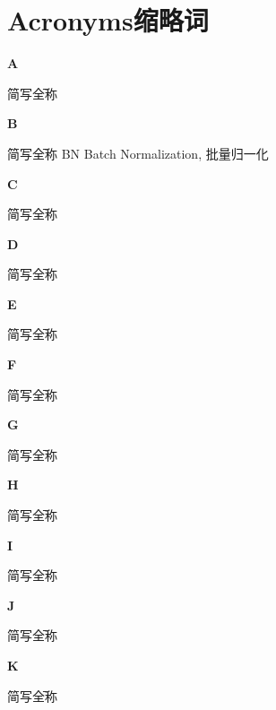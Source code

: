 \section{Acronyms缩略词}



\noindent\textbf{\LARGE A}
\begin{tabbing}
    简写\qquad\qquad\qquad\= 全称 \kill
\end{tabbing}

\noindent\textbf{\LARGE B}
\begin{tabbing}
    简写\qquad\qquad\qquad\= 全称 \kill
    BN \> Batch Normalization, 批量归一化
\end{tabbing}

\noindent\textbf{\LARGE C}
\begin{tabbing}
    简写\qquad\qquad\qquad\= 全称 \kill
\end{tabbing}

\noindent\textbf{\LARGE D}
\begin{tabbing}
    简写\qquad\qquad\qquad\= 全称 \kill
\end{tabbing}

\noindent\textbf{\LARGE E}
\begin{tabbing}
    简写\qquad\qquad\qquad\= 全称 \kill
\end{tabbing}

\noindent\textbf{\LARGE F}
\begin{tabbing}
    简写\qquad\qquad\qquad\= 全称 \kill
\end{tabbing}

\noindent\textbf{\LARGE G}
\begin{tabbing}
    简写\qquad\qquad\qquad\= 全称 \kill
\end{tabbing}

\noindent\textbf{\LARGE H}
\begin{tabbing}
    简写\qquad\qquad\qquad\= 全称 \kill
\end{tabbing}

\noindent\textbf{\LARGE I}
\begin{tabbing}
    简写\qquad\qquad\qquad\= 全称 \kill
\end{tabbing}

\noindent\textbf{\LARGE J}
\begin{tabbing}
    简写\qquad\qquad\qquad\= 全称 \kill
\end{tabbing}

\noindent\textbf{\LARGE K}
\begin{tabbing}
    简写\qquad\qquad\qquad\= 全称 \kill
\end{tabbing}

